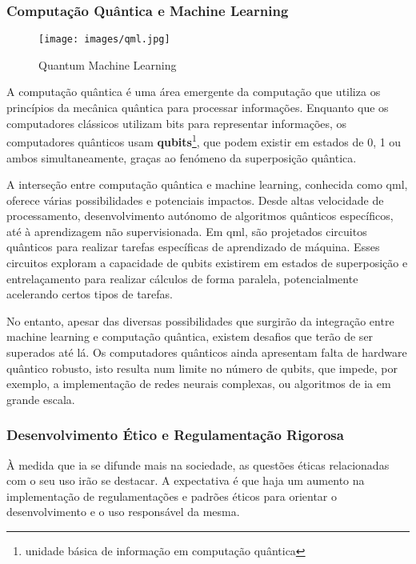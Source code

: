 \documentclass[a4paper, 11pt, onecolumn, oneside]{report}
\begin{document}
\subsubsection{Computação Quântica e Machine Learning}
%
\begin{wrapfigure}{r}{0.33\textwidth}
    \texttt{[image: images/qml.jpg]}
    \caption{Quantum Machine Learning\cite{i23}}
    \vspace{4mm}
    \label{qml}
\end{wrapfigure}
%
A computação quântica é uma área emergente da computação que utiliza os princípios da mecânica quântica para processar informações. Enquanto que os computadores clássicos utilizam bits para representar informações, os computadores quânticos usam \textbf{qubits}\footnote{unidade básica de informação em computação quântica}, que podem existir em estados de 0, 1 ou ambos simultaneamente, graças ao fenómeno da superposição quântica.
\par
A interseção entre computação quântica e machine learning, conhecida como \ac{qml}, oferece várias possibilidades e potenciais impactos. Desde altas velocidade de processamento, desenvolvimento autónomo de algoritmos quânticos específicos, até à aprendizagem não supervisionada. Em \ac{qml}, são projetados circuitos quânticos para realizar tarefas específicas de aprendizado de máquina. Esses circuitos exploram a capacidade de qubits existirem em estados de superposição e entrelaçamento para realizar cálculos de forma paralela, potencialmente acelerando certos tipos de tarefas. 
\par
No entanto, apesar das diversas possibilidades que surgirão da integração entre machine learning e computação quântica, existem desafios que terão de ser superados até lá. Os computadores quânticos ainda apresentam falta de hardware quântico robusto, isto resulta num limite no número de qubits, que impede, por exemplo, a implementação de redes neurais complexas, ou algoritmos de \ac{ia} em grande escala.

\subsubsection{Desenvolvimento Ético e Regulamentação Rigorosa}
À medida que \ac{ia} se difunde mais na sociedade, as questões éticas relacionadas com o seu uso irão se destacar. A expectativa é que haja um aumento na implementação de regulamentações e padrões éticos para orientar o desenvolvimento e o uso responsável da mesma.
\end{document}
